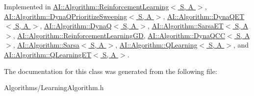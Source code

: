 Implemented in \hyperlink{classAI_1_1Algorithm_1_1ReinforcementLearning_a25d7fa245a79e61061436dc0f1db90cb}{A\+I\+::\+Algorithm\+::\+Reinforcement\+Learning$<$ S, A $>$}, \hyperlink{classAI_1_1Algorithm_1_1DynaQPrioritizeSweeping_ad08b55f3cf927189dd31abf9fc1c2959}{A\+I\+::\+Algorithm\+::\+Dyna\+Q\+Prioritize\+Sweeping$<$ S, A $>$}, \hyperlink{classAI_1_1Algorithm_1_1DynaQET_a53b0e06842fbb802acfa5384a84ad448}{A\+I\+::\+Algorithm\+::\+Dyna\+Q\+E\+T$<$ S, A $>$}, \hyperlink{classAI_1_1Algorithm_1_1DynaQ_a4542226b17db4ed8a2c5ec17d37dc42f}{A\+I\+::\+Algorithm\+::\+Dyna\+Q$<$ S, A $>$}, \hyperlink{classAI_1_1Algorithm_1_1SarsaET_adf13376b7ec8fdfa2b19ffadb1aa81e7}{A\+I\+::\+Algorithm\+::\+Sarsa\+E\+T$<$ S, A $>$}, \hyperlink{classAI_1_1Algorithm_1_1ReinforcementLearningGD_afca8d60ac090dec611f3834c0e8872c0}{A\+I\+::\+Algorithm\+::\+Reinforcement\+Learning\+G\+D}, \hyperlink{classAI_1_1Algorithm_1_1DynaQCC_ae23b8f0afbb9fc5024aef9ce720c9b84}{A\+I\+::\+Algorithm\+::\+Dyna\+Q\+C\+C$<$ S, A $>$}, \hyperlink{classAI_1_1Algorithm_1_1Sarsa_ae1d62478d3e31cace3fb594e05f83d1c}{A\+I\+::\+Algorithm\+::\+Sarsa$<$ S, A $>$}, \hyperlink{classAI_1_1Algorithm_1_1QLearning_a042e1987ce21a94f59603c4cb1eeed82}{A\+I\+::\+Algorithm\+::\+Q\+Learning$<$ S, A $>$}, and \hyperlink{classAI_1_1Algorithm_1_1QLearningET_a9a245dcb3ca8f26b37e5a6daa6d4a898}{A\+I\+::\+Algorithm\+::\+Q\+Learning\+E\+T$<$ S, A $>$}.



The documentation for this class was generated from the following file\+:\begin{DoxyCompactItemize}
\item 
Algorithms/Learning\+Algorithm.\+h\end{DoxyCompactItemize}
